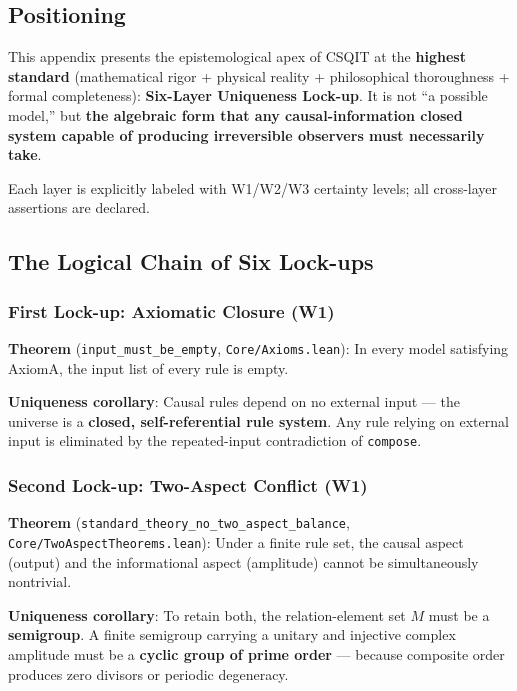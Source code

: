 \documentclass[aps,prd,twocolumn,nofootinbib,floatfix]{revtex4-2}
\begin{document}
\subsection{Positioning}

This appendix presents the epistemological apex of CSQIT at the \textbf{highest standard} (mathematical rigor + physical reality + philosophical thoroughness + formal completeness): \textbf{Six-Layer Uniqueness Lock-up}. It is not ``a possible model,'' but \textbf{the algebraic form that any causal-information closed system capable of producing irreversible observers must necessarily take}.

Each layer is explicitly labeled with W1/W2/W3 certainty levels; all cross-layer assertions are declared.

\subsection{The Logical Chain of Six Lock-ups}

\subsubsection*{First Lock-up: Axiomatic Closure (W1)}

\textbf{Theorem} (\texttt{input\_must\_be\_empty}, \texttt{Core/Axioms.lean}): In every model satisfying AxiomA, the input list of every rule is empty.

\textbf{Uniqueness corollary}: Causal rules depend on no external input --- the universe is a \textbf{closed, self-referential rule system}. Any rule relying on external input is eliminated by the repeated-input contradiction of \texttt{compose}.

\subsubsection*{Second Lock-up: Two-Aspect Conflict (W1)}

\textbf{Theorem} (\texttt{standard\_theory\_no\_two\_aspect\_balance}, \texttt{Core/TwoAspectTheorems.lean}): Under a finite rule set, the causal aspect (output) and the informational aspect (amplitude) cannot be simultaneously nontrivial.

\textbf{Uniqueness corollary}: To retain both, the relation-element set $M$ must be a \textbf{semigroup}. A finite semigroup carrying a unitary and injective complex amplitude must be a \textbf{cyclic group of prime order} --- because composite order produces zero divisors or periodic degeneracy.
\end{document}
